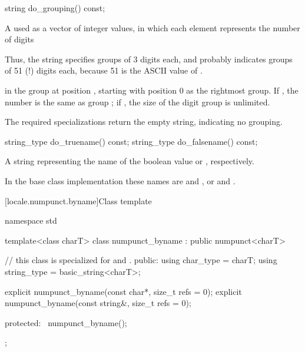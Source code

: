 %
\begin{itemdecl}
string do_grouping() const;
\end{itemdecl}

\begin{itemdescr}
\pnum
\returns
A   used as a vector of integer values,
in which each element  represents the number of digits
\begin{footnote}
Thus,
the string  specifies groups of 3 digits each, and
 probably indicates groups of 51 (!) digits each,
because 51 is the ASCII value of .
\end{footnote}
in the group at position ,
starting with position 0 as the rightmost group.
If ,
the number is the same as group ;
if ,
the size of the digit group is unlimited.

\pnum
The required specializations return the empty string, indicating no grouping.
\end{itemdescr}

%
%
\begin{itemdecl}
string_type do_truename()  const;
string_type do_falsename() const;
\end{itemdecl}

\begin{itemdescr}
\pnum
\returns
A string representing the name of
the boolean value  or , respectively.

\pnum
In the base class implementation
these names are  and ,
or  and .
\end{itemdescr}

[locale.numpunct.byname]{Class template }

%
\begin{codeblock}
namespace std {
  template<class charT>
    class numpunct_byname : public numpunct<charT> {
    // this class is specialized for  and .
    public:
      using char_type   = charT;
      using string_type = basic_string<charT>;

      explicit numpunct_byname(const char*, size_t refs = 0);
      explicit numpunct_byname(const string&, size_t refs = 0);

    protected:
      ~numpunct_byname();
    };
}
\end{codeblock}

